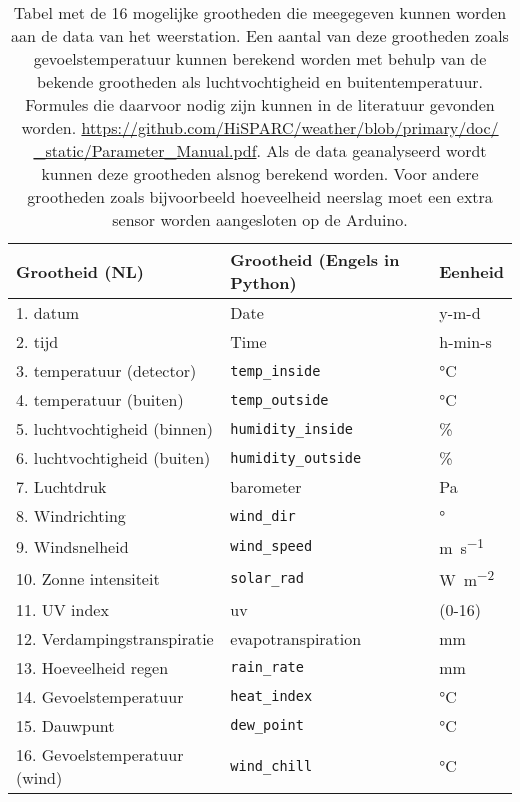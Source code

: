 \begin{table}
    \centering
    \begin{tabular}{ | l | l | l |}
        \hline
        \textbf{Grootheid (NL)} & \textbf{Grootheid (Engels in Python)} & \textbf{Eenheid} \\ \hline
        1. datum & Date & y-m-d \\ \hline
        2. tijd & Time & h-min-s \\ \hline
        3. temperatuur (detector) & \verb|temp_inside| & \si{\celsius} \\ \hline
        4. temperatuur (buiten) & \verb|temp_outside| & \si{\celsius} \\ \hline
        5. luchtvochtigheid (binnen) & \verb|humidity_inside|& \si{\percent} \\ \hline
        6. luchtvochtigheid (buiten) & \verb|humidity_outside| & \si{\percent} \\ \hline
        7. Luchtdruk & barometer & \si{\pascal} \\ \hline
        8. Windrichting & \verb|wind_dir| & \si{\degree} \\ \hline
        9. Windsnelheid & \verb|wind_speed| & \si{\meter\per\second} \\ \hline
        10. Zonne intensiteit & \verb|solar_rad| & \si{\watt\per\square\meter} \\ \hline
        11. UV index & uv & (0-16) \\ \hline
        12. Verdampingstranspiratie & evapotranspiration & \si{\milli\meter} \\ \hline
        13. Hoeveelheid regen & \verb|rain_rate| & \si{\milli\meter} \\ \hline
        14. Gevoelstemperatuur & \verb|heat_index| & \si{\celsius} \\ \hline
        15. Dauwpunt & \verb|dew_point| & \si{\celsius} \\ \hline
        16. Gevoelstemperatuur (wind) & \verb|wind_chill| & \si{\celsius} \\ \hline
   \end{tabular}
   \caption{Tabel met de 16 mogelijke grootheden die meegegeven kunnen
            worden aan de data van het weerstation. Een aantal van deze
            grootheden zoals gevoelstemperatuur kunnen berekend worden met behulp
            van de bekende grootheden als luchtvochtigheid en buitentemperatuur.
            Formules die daarvoor nodig zijn kunnen in de literatuur gevonden
            worden.
            \protect\url{https://github.com/HiSPARC/weather/blob/primary/doc/
            _static/Parameter_Manual.pdf}. Als de data geanalyseerd wordt kunnen
            deze grootheden alsnog berekend worden. Voor andere grootheden zoals
            bijvoorbeeld hoeveelheid neerslag moet een extra sensor worden
            aangesloten op de Arduino.}
   \label{table:grootheden}
\end{table}

